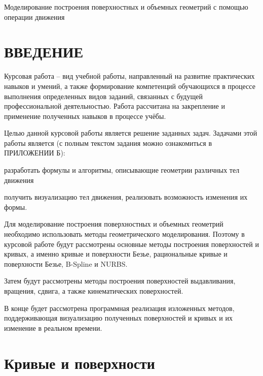 \documentclass{bmstu}
\newenvironment{gost-itemize}
{\begin{itemize}[label=---,itemindent=\parindent,leftmargin=0pt]}
	{\end{itemize}}
\renewcommand{\maketableofcontents}
    {
        \setlength{\cftbeforetoctitleskip}{-2em}
        \setlength{\cftaftertoctitleskip}{0em}
        \renewcommand\contentsname{
            \normalsize \centerline{\MakeUppercase{Содержание}}\hfill c.
        }
        \begin{singlespace}
            \tableofcontents
        \end{singlespace}
    }
\begin{document}
\makecourseworktitle
{} %
{} %
{Моделирование построения поверхностных и объемных геометрий с помощью операции движения} %
{} %
{} %
{} %

\maketableofcontents

\chapter*{ВВЕДЕНИЕ}
Курсовая работа – вид учебной работы, направленный на развитие практических навыков и умений, а также формирование компетенций обучающихся в процессе выполнения определенных видов заданий, связанных с будущей профессиональной деятельностью. Работа рассчитана на закрепление и применение полученных навыков в процессе учёбы.

Целью данной курсовой работы является решение заданных задач. Задачами этой работы является (с полным текстом задания можно ознакомиться в ПРИЛОЖЕНИИ Б):
\begin{gost-itemize}
\item разработать формулы и алгоритмы, описывающие геометрии различных тел движения
\item получить визуализацию тел движения, реализовать возможность изменения их формы.
\end{gost-itemize}

Для моделирование построения поверхностных и объемных геометрий необходимо использовать методы геометрического моделирования.
Поэтому в курсовой работе будут рассмотрены основные методы построения поверхностей и кривых, а именно  кривые и поверхности Безье, рациональные кривые и поверхности Безье, B-Spline и NURBS.

Затем будут рассмотрены методы построения поверхностей выдавливания, вращения, сдвига, а также кинематических поверхностей.

В конце будет рассмотрена программная реализация изложенных методов, поддерживающая визуализацию полученных поверхностей и кривых и их изменение в реальном времени.



\chapter{Кривые и поверхности}
\end{document}
